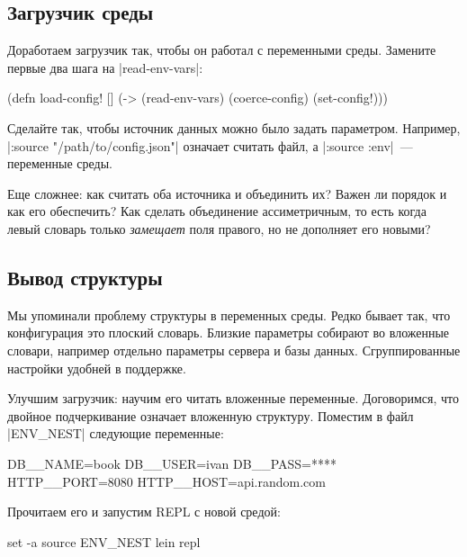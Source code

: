 \subsection{Загрузчик среды}

Доработаем загрузчик так, чтобы он работал с переменными среды. Замените первые
два шага на \spverb|read-env-vars|:

\begin{english}
  \begin{clojure}
(defn load-config! []
  (-> (read-env-vars)
      (coerce-config)
      (set-config!)))
  \end{clojure}
\end{english}

Сделайте так, чтобы источник данных можно было задать параметром. Например,
\spverb|:source "/path/to/config.json"| означает считать файл, а
\spverb|:source :env|~--- переменные среды.

Еще сложнее: как считать оба источника и объединить их? Важен ли порядок и как
его обеспечить? Как сделать объединение ассиметричным, то есть когда левый
словарь только \emph{замещает} поля правого, но не дополняет его новыми?

\subsection{Вывод структуры}

Мы упоминали проблему структуры в переменных среды. Редко бывает так, что
конфигурация это плоский словарь. Близкие параметры собирают во вложенные
словари, например отдельно параметры сервера и базы данных. Сгруппированные
настройки удобней в поддержке.

Улучшим загрузчик: научим его читать вложенные переменные. Договоримся, что
двойное подчеркивание означает вложенную структуру. Поместим в файл
\spverb|ENV_NEST| следующие переменные:

\begin{english}
  \begin{bash}
DB__NAME=book
DB__USER=ivan
DB__PASS=****
HTTP__PORT=8080
HTTP__HOST=api.random.com
  \end{bash}
\end{english}

\noindent
Прочитаем его и запустим REPL с новой средой:

\begin{english}
  \begin{bash}
set -a
source ENV_NEST
lein repl
  \end{bash}
\end{english}


